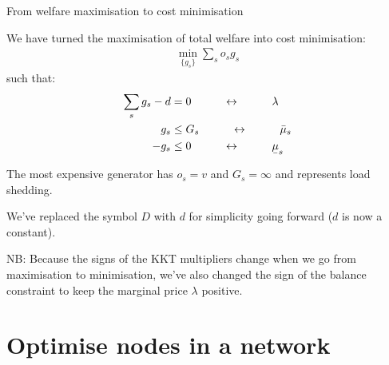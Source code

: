 \documentclass[10pt,aspectratio=169,dvipsnames]{beamer}
\def\l{\lambda}
\def\m{\mu}
\newcommand{\ubar}[1]{\text{\b{$#1$}}}
\begin{document}
\begin{frame}{From welfare maximisation to cost minimisation}

 We have  turned the maximisation of total welfare into \alert{cost minimisation}:
  \begin{align*}
    \min_{\{g_s\}}  \sum_s o_s g_s
  \end{align*}
  such that:
  \begin{align*}
    \sum_s g_s - d & = 0  \hspace{1cm}\leftrightarrow\hspace{1cm} \l \\
        g_s  & \leq  G_s  \hspace{1cm}\leftrightarrow\hspace{1cm} \bar{\m}_s \\
    - g_s  & \leq  0  \hspace{1cm}\leftrightarrow\hspace{1cm} \ubar{\m}_s
  \end{align*}

  The most expensive generator has $o_s = v$ and $G_s = \infty$ and
  represents \alert{load shedding}.

  We've replaced the symbol $D$  with $d$ for simplicity going forward ($d$ is now a constant).



  NB: Because the signs of the KKT multipliers change when we go from
  maximisation to minimisation, we've also changed the sign of the
  balance constraint to keep the marginal price $\l$ positive.
\end{frame}


\section{Optimise nodes in a network}
\end{document}
